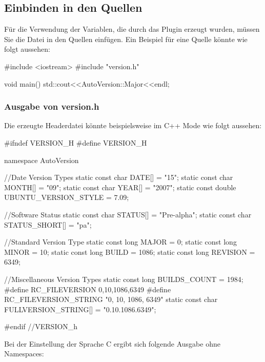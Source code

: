 \subsection{Einbinden in den Quellen}

Für die Verwendung der Variablen, die durch das Plugin erzeugt wurden, müssen Sie die Datei  in den Quellen einfügen. Ein Beispiel für eine Quelle könnte wie folgt aussehen:

\begin{code}
#include <iostream>
#include "version.h"

void main(){
    std::cout<<AutoVersion::Major<<endl;
}
\end{code}

\subsubsection{Ausgabe von version.h}

Die erzeugte Headerdatei könnte beispielsweise im C++ Mode wie folgt aussehen:

\begin{code}
#ifndef VERSION_H
#define VERSION_H

namespace AutoVersion{

	//Date Version Types
	static const char DATE[] = "15";
	static const char MONTH[] = "09";
	static const char YEAR[] = "2007";
	static const double UBUNTU_VERSION_STYLE = 7.09;

	//Software Status
	static const char STATUS[] = "Pre-alpha";
	static const char STATUS_SHORT[] = "pa";

	//Standard Version Type
	static const long MAJOR = 0;
	static const long MINOR = 10;
	static const long BUILD = 1086;
	static const long REVISION = 6349;

	//Miscellaneous Version Types
	static const long BUILDS_COUNT = 1984;
	#define RC_FILEVERSION 0,10,1086,6349
	#define RC_FILEVERSION_STRING "0, 10, 1086, 6349\0"
	static const char FULLVERSION_STRING[] = "0.10.1086.6349";

}
#endif //VERSION_h
\end{code}

Bei der Einstellung der Sprache C ergibt sich folgende Ausgabe ohne Namespaces:

